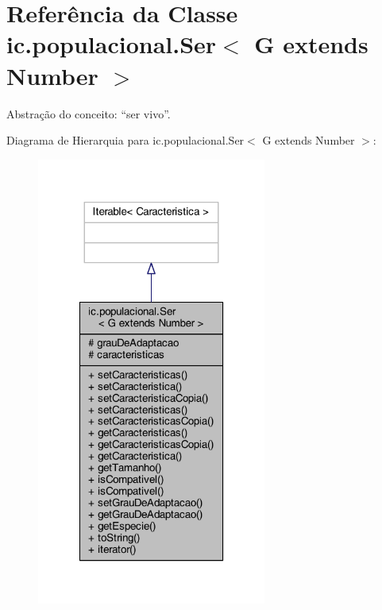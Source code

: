 \hypertarget{classic_1_1populacional_1_1_ser_3_01_g_01extends_01_number_01_4}{\section{Referência da Classe ic.\-populacional.\-Ser$<$ G extends Number $>$}
\label{classic_1_1populacional_1_1_ser_3_01_g_01extends_01_number_01_4}
}


Abstração do conceito\-: “ser vivo”.  




Diagrama de Hierarquia para ic.\-populacional.\-Ser$<$ G extends Number $>$\-:\nopagebreak
\begin{figure}[H]
\begin{center}
\leavevmode
\includegraphics[width=214pt]{classic_1_1populacional_1_1_ser_3_01_g_01extends_01_number_01_4__inherit__graph}
\end{center}
\end{figure}


